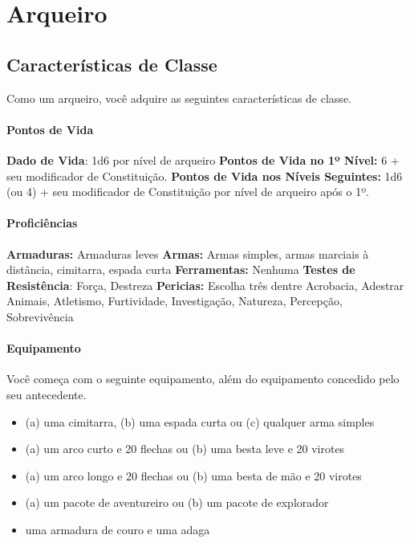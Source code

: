 \documentclass{RPG_Adventure}[2021/10/20]
\begin{document}

\chapter{Arqueiro}%
\label{cha:arqueiro}
\begin{multicols}{2}

\section*{Características de Classe}%

Como um arqueiro, você adquire as seguintes características de classe.

\subsubsection{Pontos de Vida}%

\noindent\textbf{Dado de Vida}: 1d6 por nível de arqueiro \nl
\textbf{Pontos de Vida no 1º Nível:} 6 + seu modificador de Constituição. \nl
\textbf{Pontos de Vida nos Níveis Seguintes:} 1d6 (ou 4) + seu modificador de
Constituição por nível de arqueiro após o 1º.

\subsubsection{Proficiências}%

\noindent\textbf{Armaduras:} Armaduras leves \nl
\textbf{Armas:} Armas simples, armas marciais à distância, cimitarra, espada
curta \nl
\textbf{Ferramentas:} Nenhuma \jump
\textbf{Testes de Resistência}: Força, Destreza \nl
\textbf{Pericias:} Escolha três dentre Acrobacia, Adestrar Animais, Atletismo,
Furtividade, Investigação, Natureza, Percepção, Sobrevivência

\subsubsection{Equipamento}%

Você começa com o seguinte equipamento, além do equipamento concedido pelo seu
antecedente.
\begin{itemize}
    \item (a) uma cimitarra, (b) uma espada curta ou (c) qualquer arma simples
    \item (a) um arco curto e 20 flechas ou (b) uma besta leve e 20 virotes
    \item (a) um arco longo e 20 flechas ou (b) uma besta de mão e 20 virotes
    \item (a) um pacote de aventureiro ou (b) um pacote de explorador
    \item uma armadura de couro e uma adaga
\end{itemize}


\end{multicols}
\end{document}
